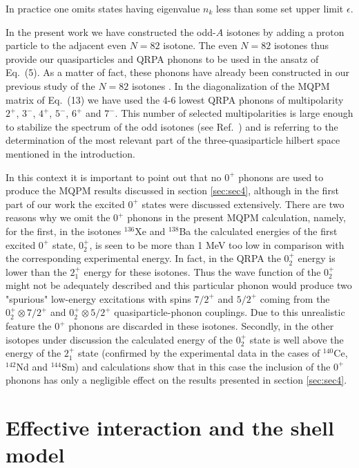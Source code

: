 In practice one omits states having eigenvalue $n_k$ less
than some set upper limit $\epsilon$.

In the present work we have constructed the odd-$A$ isotones by adding
a proton particle to the adjacent even $N=82$ isotone. 
The even $N=82$ isotones thus provide our quasiparticles and QRPA phonons 
to be used in the ansatz of Eq.\ (5). 
As a matter of fact, these phonons have
already been constructed in our previous study of the $N=82$ isotones
\cite{HOL97}. In the diagonalization of the MQPM
matrix of Eq.\ (13) we have used the 4-6 lowest QRPA phonons of
multipolarity $2^+$, $3^-$, $4^+$, $5^-$, $6^+$ and $7^-$. This number
of selected multipolarities is large enough to stabilize the spectrum
of the odd isotones (see Ref.\ \cite{TOI95}) and is referring to the
determination of the most relevant part of the
three-quasiparticle hilbert space mentioned in the introduction.

In this context it is important to point out that no $0^+$ phonons
are used to produce the MQPM results discussed in section
\ref{sec:sec4},
although in the first part of our work \cite{HOL97} the excited $0^+$ 
states were discussed extensively. There are two reasons why we omit
the $0^+$ phonons in the present MQPM calculation, namely, for the first, 
in the isotones $^{136}$Xe and $^{138}$Ba the calculated
energies of the first excited $0^+$ state, $0^+_2$, is seen to be more
than 1 MeV too low in comparison with the corresponding experimental
energy. In fact, in the QRPA the $0^+_2$ energy is lower than the 
$2^+_1$ energy for these isotones. Thus the wave function of the $0^+_2$
might not be adequately described
and this particular phonon would produce two
"spurious" low-energy excitations with spins $7/2^+$ and $5/2^+$ coming
from the $0^+_2\otimes 7/2^+$ and $0^+_2\otimes 5/2^+$ quasiparticle-phonon
couplings. Due to this unrealistic feature the $0^+$ phonons are discarded
in these isotones. Secondly, in the other isotopes under discussion
the calculated energy of the $0^+_2$ state is well above the energy
of the $2^+_1$ state (confirmed by the experimental data in the cases of
$^{140}$Ce, $^{142}$Nd and $^{144}$Sm) and calculations show that in
this case the inclusion of the $0^+$ phonons has only a negligible
effect on the results presented in section \ref{sec:sec4}.



\section{Effective interaction and the shell model}\label{sec:sec3}

